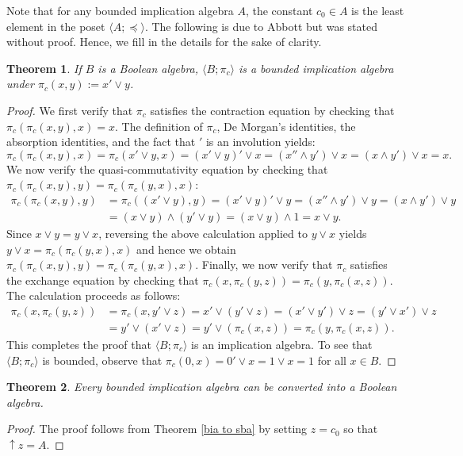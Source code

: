 \documentclass[reqno]{amsart}
\theoremstyle{plain}
\newtheorem{theorem}{Theorem}[section]
\theoremstyle{definition}
\begin{document}
    Note that for any bounded implication algebra $A$, the constant $c_0\in A$ is the least element in the poset $\langle A;\preceq\rangle$. The following is due to Abbott \cite{abbott672} but was stated without proof. Hence, we fill in the details for the sake of clarity. 
\begin{theorem}\label{ba to bia}
    If $B$ is a Boolean algebra, $\langle B;\pi_c\rangle$ is a bounded implication algebra under $\pi_c(x,y):=x'\vee y$. 
\end{theorem}
\begin{proof}
    We first verify that $\pi_c$ satisfies the contraction equation by checking that $\pi_c(\pi_c(x,y),x)=x$. The definition of $\pi_c$, De Morgan's identities, the absorption identities, and the fact that $'$ is an involution yields: \[\pi_c(\pi_c(x,y),x)=\pi_c(x'\vee y,x)=(x'\vee y)'\vee x=(x''\wedge y')\vee x=(x\wedge y')\vee x=x.\] We now verify the quasi-commutativity equation by checking that  $\pi_c(\pi_c(x,y),y)=\pi_c(\pi_c(y,x),x)$:
    \begin{align*}
        \pi_c(\pi_c(x,y),y)&=\pi_c((x'\vee y),y)=(x'\vee y)'\vee y=(x''\wedge y')\vee y=(x\wedge y')\vee y\\&=(x\vee y)\wedge(y'\vee y)=(x\vee y)\wedge 1=x\vee y.
    \end{align*}
    Since $x\vee y=y\vee x$, reversing the above calculation applied to $y\vee x$ yields $y\vee x=\pi_c(\pi_c(y,x),x)$ and hence we obtain $\pi_c(\pi_c(x,y),y)=\pi_c(\pi_c(y,x),x)$. Finally, we now verify that $\pi_c$ satisfies the exchange equation by checking that $\pi_c(x,\pi_c(y,z))=\pi_c(y,\pi_c(x,z))$. The calculation proceeds as follows:
    \begin{align*}
        \pi_c(x,\pi_c(y,z))&=\pi_c(x,y'\vee z)=x'\vee(y'\vee z)=(x'\vee y')\vee z=(y'\vee x')\vee z
        \\&=y'\vee(x'\vee z)=y'\vee(\pi_c(x,z))=\pi_c(y,\pi_c(x,z)).
    \end{align*}
    This completes the proof that $\langle B;\pi_c\rangle$ is an implication algebra. To see that $\langle B;\pi_c\rangle$ is bounded, observe that $\pi_c(0,x)=0'\vee x=1\vee x=1$ for all $x\in B$.  
\end{proof}
\begin{theorem}\label{bia to ba}
    Every bounded implication algebra can be converted into a Boolean algebra. 
\end{theorem}
\begin{proof}
    The proof follows from Theorem \ref{bia to sba} by setting $z=c_0$ so that ${\uparrow}z=A$.  
\end{proof}
\end{document}
